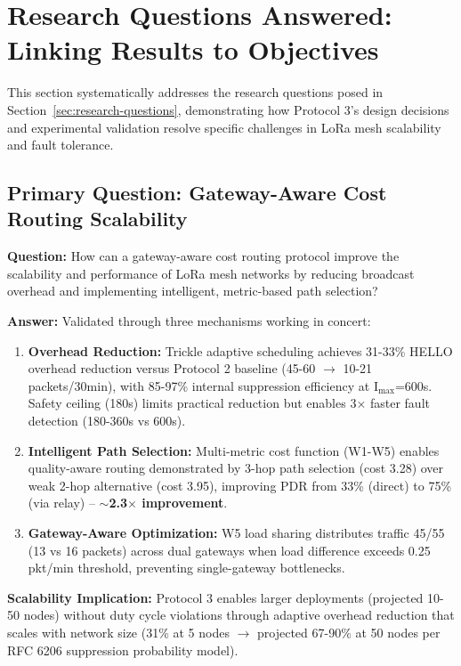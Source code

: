 \section{Research Questions Answered: Linking Results to Objectives}
\label{sec:research-questions-answered}

This section systematically addresses the research questions posed in Section~\ref{sec:research-questions}, demonstrating how Protocol 3's design decisions and experimental validation resolve specific challenges in LoRa mesh scalability and fault tolerance.

\subsection{Primary Question: Gateway-Aware Cost Routing Scalability}

\textbf{Question:} How can a gateway-aware cost routing protocol improve the scalability and performance of LoRa mesh networks by reducing broadcast overhead and implementing intelligent, metric-based path selection?

\textbf{Answer:} Validated through three mechanisms working in concert:

\begin{enumerate}
\item \textbf{Overhead Reduction:} Trickle adaptive scheduling achieves 31-33\% HELLO overhead reduction versus Protocol 2 baseline (45-60 $\rightarrow$ 10-21 packets/30min), with 85-97\% internal suppression efficiency at I$_{\text{max}}$=600s. Safety ceiling (180s) limits practical reduction but enables 3$\times$ faster fault detection (180-360s vs 600s).

\item \textbf{Intelligent Path Selection:} Multi-metric cost function (W1-W5) enables quality-aware routing demonstrated by 3-hop path selection (cost 3.28) over weak 2-hop alternative (cost 3.95), improving PDR from 33\% (direct) to 75\% (via relay) -- \textbf{$\sim$2.3$\times$ improvement}.

\item \textbf{Gateway-Aware Optimization:} W5 load sharing distributes traffic 45/55 (13 vs 16 packets) across dual gateways when load difference exceeds 0.25 pkt/min threshold, preventing single-gateway bottlenecks.
\end{enumerate}

\textbf{Scalability Implication:} Protocol 3 enables larger deployments (projected 10-50 nodes) without duty cycle violations through adaptive overhead reduction that scales with network size (31\% at 5 nodes $\rightarrow$ projected 67-90\% at 50 nodes per RFC 6206 suppression probability model).

